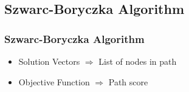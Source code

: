 
\subsection{Szwarc-Boryczka Algorithm}

\begin{frame}
    \frametitle{Szwarc-Boryczka Algorithm \cite{szwarc_novel_2022}}


    \begin{itemize}
        \item<1-> Solution Vectors $\Rightarrow$ List of nodes in path
        \item<2-> Objective Function $\Rightarrow$ Path score
    \end{itemize}
\end{frame}

